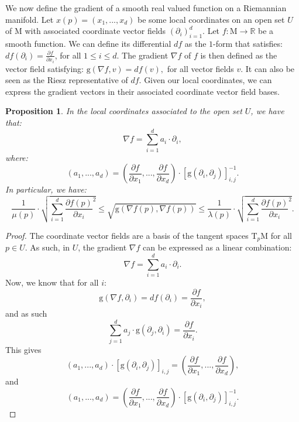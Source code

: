 \documentclass[pdflatex,sn-mathphys-ay]{sn-jnl}%
\newtheorem{proposition}{Proposition}[section]
\newcommand{\man}{\mathrm{M}}
\newcommand{\g}{\mathrm{g}}
\newcommand{\tangent}{\mathrm{T}}
\newcommand{\R}{\mathbb{R}}
\theoremstyle{thmstyleone}%
\begin{document}
\begin{appendices}
We now define the gradient of a smooth real valued function on a Riemannian manifold. 
Let $x(p)=(x_1,...,x_d)$ be some local coordinates on an open set $U$ of $\man$
with associated coordinate vector fields $(\partial_i)_{i=1}^d$.
Let $f:\man\rightarrow\R$ be a smooth function. We can define its differential $df$ as the $1$-form that satisfies:
$df(\partial_i)=\frac{\partial f}{\partial x_i}$, 
for all $1\leq i \leq d.$
The gradient $\nabla f$ of $f$ is then defined as the vector field satisfying:
$\g(\nabla f,v)=df(v),$
for all vector fields $v$. It can also be seen as the Riesz representative of $df$.
Given our local coordinates, we can express the gradient vectors in their associated coordinate vector field bases.
\begin{proposition}\label{prop:grad}
In the local coordinates associated to the open set $U$, we have that:
$$\nabla f=\sum_{i=1}^d a_i\cdot\partial_i,$$
where:
$$(a_1,...,a_d)=\left(\frac{\partial f}{\partial x_1},...,\frac{\partial f}{\partial x_d}\right)\cdot\left[\g(\partial_i,\partial_j)\right]_{i,j}^{-1}.$$
In particular, we have:
$$\frac{1}{\mu(p)}\cdot \sqrt{\sum_{i=1}^d\frac{\partial f(p)}{\partial x_i}^2}\leq \sqrt{\g\left(\nabla f(p),\nabla f(p)\right)}\leq \frac{1}{\lambda(p)}\cdot \sqrt{\sum_{i=1}^d\frac{\partial f(p)}{\partial x_i}^2}.$$

\end{proposition}


\begin{proof}
The coordinate vector fields are a basis of the tangent spaces $\tangent_p\man$ for all $p\in U$. As such, in $U$, the gradient $\nabla f$ can be expressed as a linear combination:
$$\nabla f=\sum_{i=1}^d a_i\cdot\partial_i.$$
Now, we know that for all $i$:
$$\g\left(\nabla f,\partial_i\right)=df(\partial_i)=\frac{\partial f}{\partial x_i},$$
and as such
$$\sum_{j=1}^d a_j\cdot \g\left(\partial_j,\partial_i\right)=\frac{\partial f}{\partial x_i}.$$
This gives
$$(a_1,...,a_d)\cdot\left[\g(\partial_i,\partial_j)\right]_{i,j}=\left(\frac{\partial f}{\partial x_1},...,\frac{\partial f}{\partial x_d}\right),$$
and
$$(a_1,...,a_d)=\left(\frac{\partial f}{\partial x_1},...,\frac{\partial f}{\partial x_d}\right)\cdot\left[\g(\partial_i,\partial_j)\right]_{i,j}^{-1}.$$


\end{proof}
\end{appendices}
\end{document}
